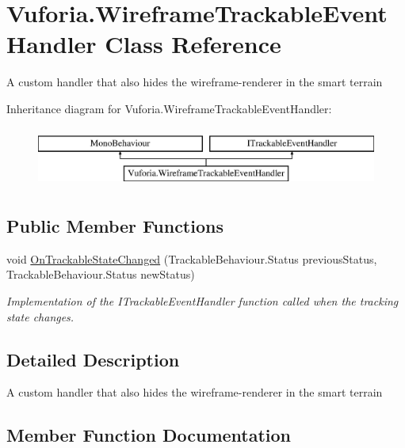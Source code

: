 \hypertarget{class_vuforia_1_1_wireframe_trackable_event_handler}{}\section{Vuforia.\+Wireframe\+Trackable\+Event\+Handler Class Reference}
\label{class_vuforia_1_1_wireframe_trackable_event_handler}


A custom handler that also hides the wireframe-\/renderer in the smart terrain  


Inheritance diagram for Vuforia.\+Wireframe\+Trackable\+Event\+Handler\+:\begin{figure}[H]
\begin{center}
\leavevmode
\includegraphics[height=2.000000cm]{class_vuforia_1_1_wireframe_trackable_event_handler}
\end{center}
\end{figure}
\subsection*{Public Member Functions}
\begin{DoxyCompactItemize}
\item 
void \hyperlink{class_vuforia_1_1_wireframe_trackable_event_handler_a80308bf61e73a21eb52e5bfe1b6823ba_a80308bf61e73a21eb52e5bfe1b6823ba}{On\+Trackable\+State\+Changed} (Trackable\+Behaviour.\+Status previous\+Status, Trackable\+Behaviour.\+Status new\+Status)
\begin{DoxyCompactList}\small\item\em Implementation of the I\+Trackable\+Event\+Handler function called when the tracking state changes. \end{DoxyCompactList}\end{DoxyCompactItemize}


\subsection{Detailed Description}
A custom handler that also hides the wireframe-\/renderer in the smart terrain 



\subsection{Member Function Documentation}
\hypertarget{class_vuforia_1_1_wireframe_trackable_event_handler_a80308bf61e73a21eb52e5bfe1b6823ba_a80308bf61e73a21eb52e5bfe1b6823ba}{}

